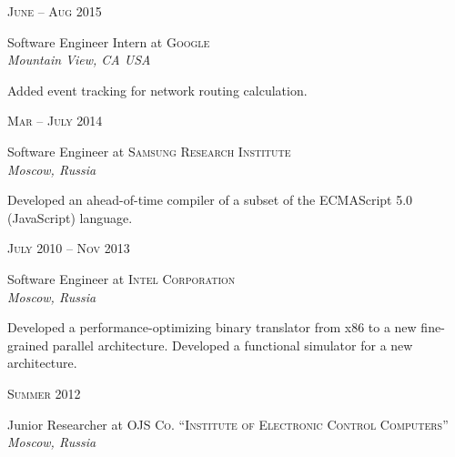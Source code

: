 \documentclass[10pt]{article} %
\begin{document}
\begin{minipage}[h]{0.5\textwidth}

{\raggedleft\textsc{June -- Aug 2015}\par}

{\raggedright\large Software Engineer Intern at \textsc{Google}\\
\textit{Mountain View, CA USA}\\[4pt]}

\normalsize{Added event tracking for network routing calculation.}\\


{\raggedleft\textsc{Mar -- July 2014}\par}

{\raggedright\large Software Engineer at \textsc{Samsung Research Institute}\\
\textit{Moscow, Russia}\\[4pt]}

\normalsize{Developed an ahead-of-time compiler of a subset of the ECMAScript 5.0 (JavaScript) language.}\\


{\raggedleft\textsc{July 2010 -- Nov 2013}\par}

{\raggedright\large Software Engineer at \textsc{Intel Corporation}\\
\textit{Moscow, Russia}\\[4pt]}

\normalsize{Developed a performance-optimizing binary translator from x86 to a
  new fine-grained parallel architecture.
  Developed a functional simulator for a new architecture.}\\


{\raggedleft\textsc{Summer 2012}\par}

{\raggedright\large Junior Researcher at \textsc{OJS Co. ``Institute of Electronic Control Computers''}\\
\textit{Moscow, Russia}\\[4pt]}


\end{minipage}
\end{document}
